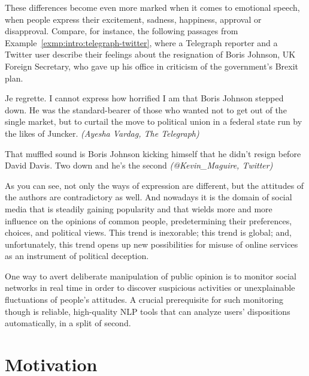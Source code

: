 These differences become even more marked when it comes to emotional
speech, when people express their excitement, sadness, happiness,
approval or disapproval.  Compare, for instance, the following
passages from Example~\ref{exmp:intro:telegraph-twitter}, where a
Telegraph reporter and a Twitter user describe their feelings about
the resignation of Boris Johnson, UK Foreign Secretary, who gave up
his office in criticism of the government's Brexit plan.
\begin{example}\label{exmp:intro:telegraph-twitter}
Je regrette. I cannot express how horrified I am that Boris Johnson
stepped down. He was the standard-bearer of those who wanted not to
get out of the single market, but to curtail the move to political
union in a federal state run by the likes of Juncker. \emph{(Ayesha
  Vardag, The Telegraph)}

\noindent{}That muffled sound is Boris Johnson kicking himself that he
didn't resign before David Davis. Two down and he's the second
\emph{(@Kevin\_Maguire, Twitter)}
\end{example}
As you can see, not only the ways of expression are different, but the
attitudes of the authors are contradictory as well. And nowadays it is
the domain of social media that is steadily gaining popularity and
that wields more and more influence on the opinions of common people,
predetermining their preferences, choices, and political views.  This
trend is inexorable; this trend is global; and, unfortunately, this
trend opens up new possibilities for misuse of online services as an
instrument of political deception.

One way to avert deliberate manipulation of public opinion is to
monitor social networks in real time in order to discover suspicious
activities or unexplainable fluctuations of people's attitudes.  A
crucial prerequisite for such monitoring though is reliable,
high-quality NLP tools that can analyze users' dispositions
automatically, in a split of second.

\section*{Motivation}

